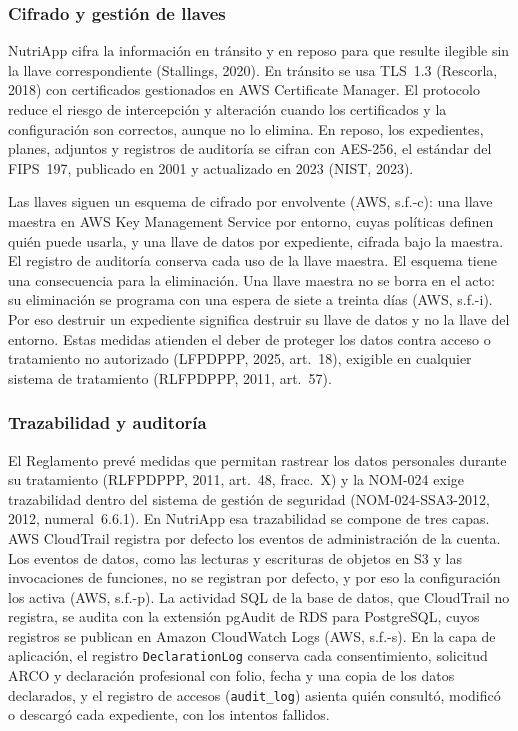 \documentclass[12pt, a4paper]{article}
\begin{document}
\subsubsection{Cifrado y gestión de llaves}
 
NutriApp cifra la información en tránsito y en reposo para que resulte
ilegible sin la llave correspondiente (Stallings, 2020). En tránsito se
usa TLS~1.3 (Rescorla, 2018) con certificados gestionados en AWS
Certificate Manager. El protocolo reduce el riesgo de intercepción y
alteración cuando los certificados y la configuración son correctos,
aunque no lo elimina. En reposo, los expedientes, planes, adjuntos y
registros de auditoría se cifran con AES-256, el estándar del FIPS~197,
publicado en 2001 y actualizado en 2023 (NIST, 2023).
 
Las llaves siguen un esquema de cifrado por envolvente (AWS,
s.f.-c): una llave maestra en AWS Key Management Service por
entorno, cuyas políticas definen quién puede usarla, y una llave de
datos por expediente, cifrada bajo la maestra. El registro de
auditoría conserva cada uso de la llave maestra. El esquema tiene una
consecuencia para la eliminación. Una llave maestra no se borra en el
acto: su eliminación se programa con una espera de siete a treinta días
(AWS, s.f.-i). Por eso destruir un expediente significa destruir su
llave de datos y no la llave del entorno. Estas medidas atienden el
deber de proteger los datos
contra acceso o tratamiento no autorizado (LFPDPPP, 2025,
art.~18), exigible en cualquier sistema de tratamiento (RLFPDPPP,
2011, art.~57).
 
\subsubsection{Trazabilidad y auditoría}
 
El Reglamento prevé medidas que permitan rastrear los datos
personales durante su tratamiento (RLFPDPPP, 2011, art.~48,
fracc.~X) y la NOM-024 exige trazabilidad dentro del sistema de
gestión de seguridad (NOM-024-SSA3-2012, 2012, numeral~6.6.1). En
NutriApp esa trazabilidad se compone de tres capas. AWS CloudTrail
registra por defecto los eventos de administración de la cuenta. Los
eventos de datos, como las lecturas y escrituras de objetos en S3 y las
invocaciones de funciones, no se registran por defecto, y por eso la
configuración los activa (AWS, s.f.-p). La
actividad SQL de la base de datos, que CloudTrail no registra, se
audita con la extensión pgAudit de RDS para PostgreSQL, cuyos registros se publican en Amazon CloudWatch Logs (AWS, s.f.-s).
En la capa de aplicación, el registro \texttt{DeclarationLog}
conserva cada consentimiento, solicitud ARCO y declaración
profesional con folio, fecha y una copia de los datos declarados, y
el registro de accesos (\texttt{audit\_log}) asienta quién consultó,
modificó o descargó cada expediente, con los intentos fallidos.
 
\end{document}

